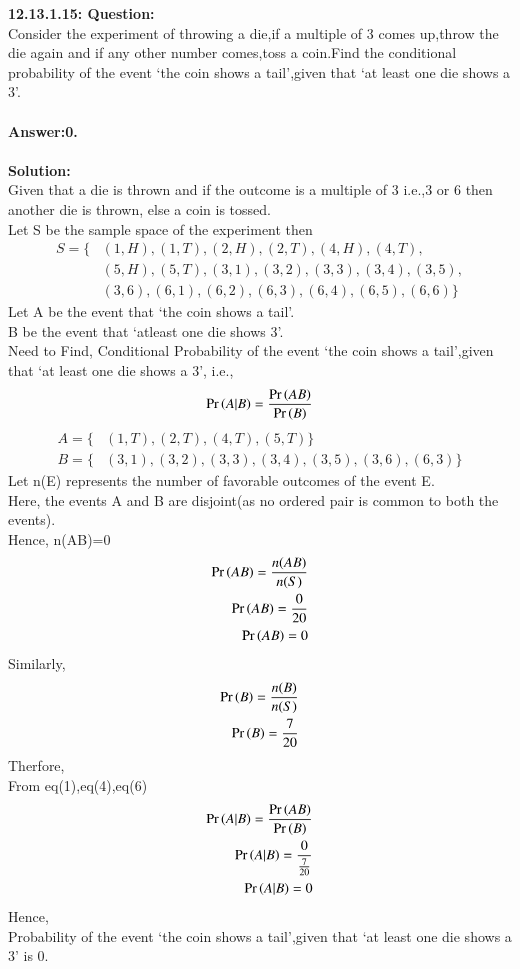 \documentclass[journal,12pt,twocolumn]{IEEEtran}
\begin{document}
\textbf{12.13.1.15: Question:}\\
 	Consider the experiment of throwing a die,if a multiple of 3 comes up,throw the die again and if any other number comes,toss a coin.Find the conditional probability of the event `the coin shows a tail',given that `at least one die shows a 3'.
\\\\
 \textbf{Answer:0.}\\
 \\
 \textbf{Solution:}
 \\
 Given that a die is thrown and if the outcome is a multiple of 3 i.e.,3 or 6 then another die is thrown, else a coin is tossed.
 \\ Let S be the sample space of the experiment then 
\begin{align*}
        S = \{ &(1,H), (1,T), (2,H), (2,T), (4,H), (4,T), \\
                &(5,H), (5,T), (3,1), (3,2), (3,3), (3,4), (3,5),\\
                &(3,6), (6,1), (6,2), (6,3), (6,4), (6,5), (6,6)\}
\end{align*}
Let A be the event that `the coin shows a tail'.
 \\B be the event that `atleast one die shows 3'.
\\ Need to Find, Conditional Probability of the event `the coin shows a tail',given that `at least one die shows a 3', i.e., 
\begin{align}
    \label{eq:1}
    \Pr\left(A|B\right)=\frac{\Pr\left(AB\right)}{\Pr\left(B\right)}
\end{align}
\begin{align*}
        A=\{&(1,T), (2,T), (4,T), (5,T)\}\\
        B=\{&(3,1), (3,2), (3,3), (3,4), (3,5), (3,6), (6,3)\}
\end{align*}
Let n(E) represents the number of favorable outcomes of the event E.
\\Here, the events A and B are disjoint(as no ordered pair is common to both the events).
\\ Hence, n(AB)=0
\begin{align}
       \Pr\left(AB\right)=\frac{n(AB)}{n(S)}\\
       \Pr\left(AB\right)=\frac{0}{20}\\
       \Pr\left(AB\right)=0
\end{align}
Similarly,
\begin{align}
       \Pr\left(B\right)=\frac{n(B)}{n(S)}\\
       \Pr\left(B\right)=\frac{7}{20}
\end{align}
Therfore, \\
From eq(1),eq(4),eq(6)\\
\begin{align}
       \Pr\left(A|B\right)=\frac{\Pr\left(AB\right)}{\Pr\left(B\right)}\\
       \Pr\left(A|B\right)=\frac{0}{\frac{7}{20}}\\
       \Pr\left(A|B\right)=0
\end{align}
Hence,
\\Probability of the event `the coin shows a tail',given that `at least one die shows a 3' is 0.
\end{document}
